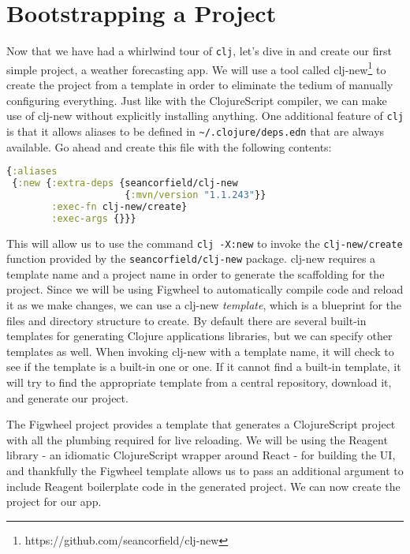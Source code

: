 \documentclass[10pt,twoside,openright]{memoir}
\begin{document}
\section{Bootstrapping a Project}

Now that we have had a whirlwind tour of \texttt{clj}, let's dive in and
create our first simple project, a weather forecasting app. We will use
a tool called clj-new\footnote{https://github.com/seancorfield/clj-new} to
create the project from a template in order to eliminate the tedium of
manually configuring everything. Just like with the ClojureScript
compiler, we can make use of clj-new without explicitly installing
anything. One additional feature of \texttt{clj} is that it allows
aliases to be defined in \texttt{\textasciitilde{}/.clojure/deps.edn}
that are always available. Go ahead and create this file with the
following contents:

\begin{lstlisting}[language=Clojure, caption={\textasciitilde{}/.clojure/deps.edn}]
{:aliases
 {:new {:extra-deps {seancorfield/clj-new
                     {:mvn/version "1.1.243"}}
        :exec-fn clj-new/create}
        :exec-args {}}}
\end{lstlisting}

This will allow us to use the command \texttt{clj\ -X:new} to invoke the
\texttt{clj-new/create} function provided by the
\texttt{seancorfield/clj-new} package. clj-new requires a template name
and a project name in order to generate the scaffolding for the project.
Since we will be using Figwheel to automatically compile code and reload
it as we make changes, we can use a clj-new \emph{template}, which is a
blueprint for the files and directory structure to create. By default
there are several built-in templates for generating Clojure applications
libraries, but we can specify other templates as well. When invoking
clj-new with a template name, it will check to see if the template is a
built-in one or one. If it cannot find a built-in template, it will try
to find the appropriate template from a central repository, download it,
and generate our project.

The Figwheel project provides a template that generates a ClojureScript
project with all the plumbing required for live reloading. We will be
using the Reagent library - an idiomatic ClojureScript wrapper around
React - for building the UI, and thankfully the Figwheel template allows
us to pass an additional argument to include Reagent boilerplate code in
the generated project. We can now create the project for our app.
\end{document}
